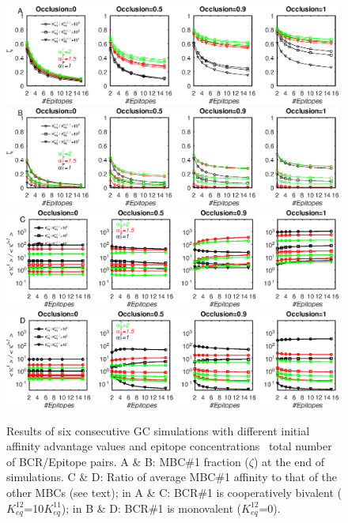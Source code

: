 \begin{figure}
\centering
\includegraphics[width=0.99\textwidth]{../figS7/occl-k12=10.eps}
\includegraphics[width=0.99\textwidth]{../figS7/occl-k12=0.eps}
\includegraphics[width=0.99\textwidth]{../figS7/affr-k12=10.eps}
\includegraphics[width=0.99\textwidth]{../figS7/affr-k12=0.eps}
\caption{Results of six consecutive GC simulations with different initial affinity advantage values and epitope concentrations
 \vs~total number of BCR/Epitope pairs.
A \& B: MBC\#1 fraction ($\zeta$) at the end of simulations.
C \& D: Ratio of average MBC\#1 affinity to that of the other MBCs (see text);
in A \& C: BCR\#1 is cooperatively bivalent ($K^{12}_{eq}$=10$K^{11}_{eq}$);
in B \& D: BCR\#1 is monovalent ($K^{12}_{eq}$=0).
}
\label{fig:agc1s}
\end{figure}

